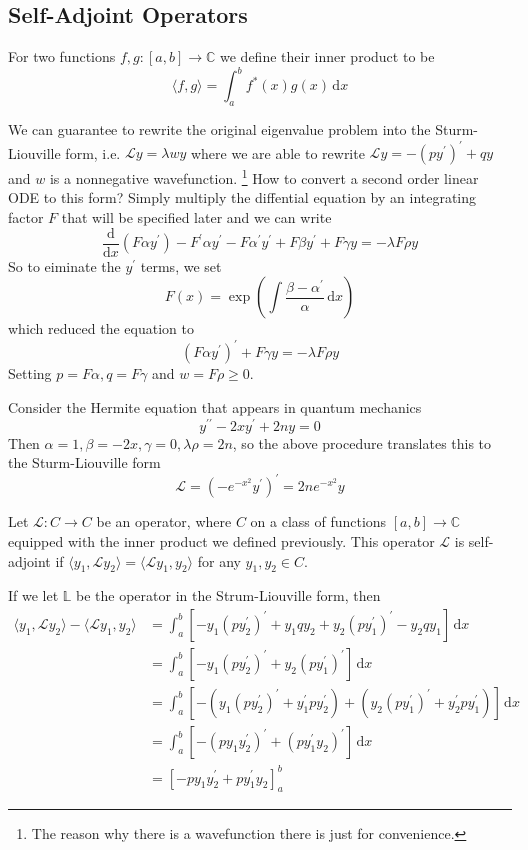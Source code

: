 \subsection{Self-Adjoint Operators}
\begin{definition}
    For two functions $f,g:[a,b]\to\mathbb C$ we define their inner product to be
    $$\langle f,g\rangle=\int_a^bf^*(x)g(x)\,\mathrm dx$$
\end{definition}
We can guarantee to rewrite the original eigenvalue problem into the Sturm-Liouville form, i.e. $\mathcal Ly=\lambda wy$ where we are able to rewrite $\mathcal Ly=-(py^\prime)^\prime+qy$ and $w$ is a nonnegative wavefunction.
\footnote{The reason why there is a wavefunction there is just for convenience.}
How to convert a second order linear ODE to this form?
Simply multiply the diffential equation by an integrating factor $F$ that will be specified later and we can write
$$\frac{\mathrm d}{\mathrm dx}(F\alpha y^\prime)-F^\prime\alpha y^\prime-F\alpha^\prime y^\prime+F\beta y^\prime+F\gamma y=-\lambda F\rho y$$
So to eiminate the $y^\prime$ terms, we set
$$F(x)=\exp\left(\int\frac{\beta-\alpha^\prime}{\alpha}\,\mathrm dx\right)$$
which reduced the equation to
$$(F\alpha y^\prime)^\prime+F\gamma y=-\lambda F\rho y$$
Setting $p=F\alpha,q=F\gamma$ and $w=F\rho\ge 0$.
\begin{example}
    Consider the Hermite equation that appears in quantum mechanics
    $$y^{\prime\prime}-2xy^\prime+2ny=0$$
    Then $\alpha=1,\beta=-2x,\gamma=0,\lambda\rho=2n$, so the above procedure translates this to the Sturm-Liouville form
    $$\mathcal L=(-e^{-x^2}y^\prime)^\prime=2ne^{-x^2}y$$
\end{example}
\begin{definition}
    Let $\mathcal L:C\to C$ be an operator, where $C$ on a class of functions $[a,b]\to\mathbb C$ equipped with the inner product we defined previously.
    This operator $\mathcal L$ is self-adjoint if $\langle y_1,\mathcal Ly_2\rangle=\langle\mathcal Ly_1,y_2\rangle$ for any $y_1,y_2\in C$.
\end{definition}
If we let $\mathbb L$ be the operator in the Strum-Liouville form, then
\begin{align*}
    \langle y_1,\mathcal Ly_2\rangle-\langle\mathcal Ly_1,y_2\rangle&=\int_a^b[-y_1(py_2^\prime)^\prime+y_1qy_2+y_2(py_1^\prime)^\prime-y_2qy_1]\,\mathrm dx\\
    &=\int_a^b[-y_1(py_2^\prime)^\prime+y_2(py_1^\prime)^\prime]\,\mathrm dx\\
    &=\int_a^b[-(y_1(py_2^\prime)^\prime+y_1^\prime py_2^\prime)+(y_2(py_1^\prime)^\prime+y_2^\prime py_1^\prime)]\,\mathrm dx\\
    &=\int_a^b[-(py_1y_2^\prime)^\prime+(py_1^\prime y_2)^\prime]\,\mathrm dx\\
    &=[-py_1y_2^\prime+py_1^\prime y_2]_a^b
\end{align*}
